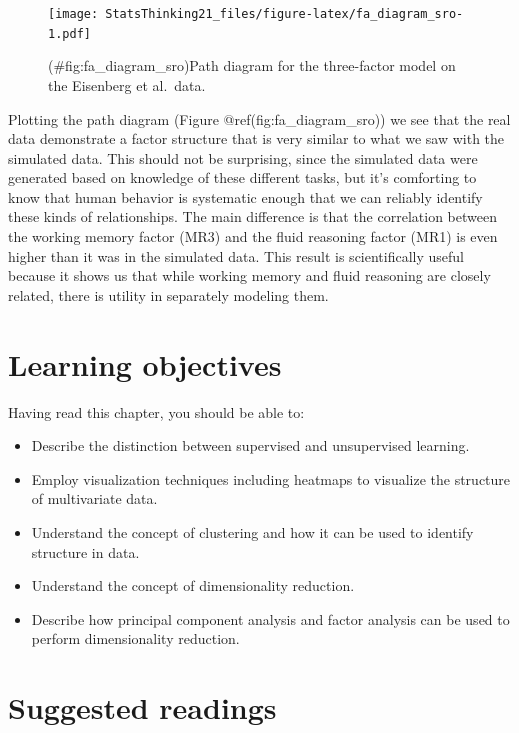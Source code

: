 \documentclass[
  12pt,
]{book}
\providecommand{\tightlist}{%
  \setlength{\itemsep}{0pt}\setlength{\parskip}{0pt}}
\begin{document}
\begin{figure}
\centering
\texttt{[image: StatsThinking21\_files/figure-latex/fa\_diagram\_sro-1.pdf]}
\caption{(\#fig:fa\_diagram\_sro)Path diagram for the three-factor model on the Eisenberg et al.~data.}
\end{figure}

Plotting the path diagram (Figure @ref(fig:fa\_diagram\_sro)) we see that the real data demonstrate a factor structure that is very similar to what we saw with the simulated data. This should not be surprising, since the simulated data were generated based on knowledge of these different tasks, but it's comforting to know that human behavior is systematic enough that we can reliably identify these kinds of relationships. The main difference is that the correlation between the working memory factor (MR3) and the fluid reasoning factor (MR1) is even higher than it was in the simulated data. This result is scientifically useful because it shows us that while working memory and fluid reasoning are closely related, there is utility in separately modeling them.

\hypertarget{learning-objectives-15}{%
\section{Learning objectives}\label{learning-objectives-15}}

Having read this chapter, you should be able to:

\begin{itemize}
\tightlist
\item
  Describe the distinction between supervised and unsupervised learning.
\item
  Employ visualization techniques including heatmaps to visualize the structure of multivariate data.
\item
  Understand the concept of clustering and how it can be used to identify structure in data.
\item
  Understand the concept of dimensionality reduction.
\item
  Describe how principal component analysis and factor analysis can be used to perform dimensionality reduction.
\end{itemize}

\hypertarget{suggested-readings-11}{%
\section{Suggested readings}\label{suggested-readings-11}}
\end{document}
